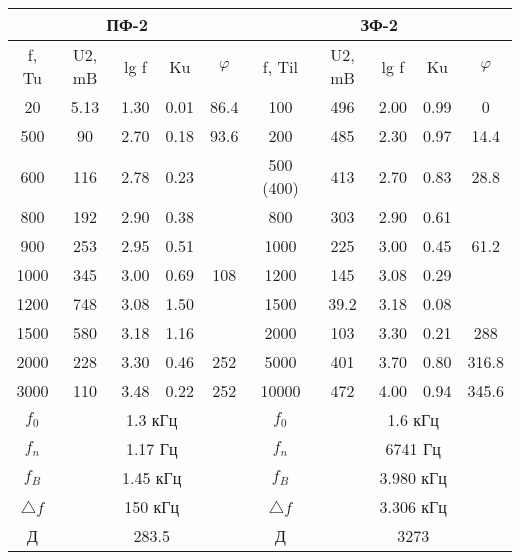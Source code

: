 \documentclass[a4paper,14pt]{extreport}
\begin{document}
\begin{table}[]%
	\begin{center}
		
			\begin{tabular}{|c|c|c|c|c|c|c|c|c|c|}
			\hline
			\multicolumn{5}{|c|}{ПФ-2}               & \multicolumn{5}{c|}{ЗФ-2}                  \\ \hline
			f, Tu      & U2, mB & lg f & Ku   & $\varphi$    & f, Til     & U2, mB  & lg f & Ku   & $\varphi$     \\ \hline
			20         & 5.13   & 1.30 & 0.01 & 86.4 & 100        & 496     & 2.00 & 0.99 & 0     \\ \hline
			500        & 90     & 2.70 & 0.18 & 93.6 & 200        & 485     & 2.30 & 0.97 & 14.4  \\ \hline
			600        & 116    & 2.78 & 0.23 &      & 500 (400)  & 413     & 2.70 & 0.83 & 28.8  \\ \hline
			800        & 192    & 2.90 & 0.38 &      & 800        & 303     & 2.90 & 0.61 &       \\ \hline
			900        & 253    & 2.95 & 0.51 &      & 1000       & 225     & 3.00 & 0.45 & 61.2  \\ \hline
			1000       & 345    & 3.00 & 0.69 & 108  & 1200       & 145     & 3.08 & 0.29 &       \\ \hline
			1200       & 748    & 3.08 & 1.50 &      & 1500       & 39.2    & 3.18 & 0.08 &       \\ \hline
			1500       & 580    & 3.18 & 1.16 &      & 2000       & 103     & 3.30 & 0.21 & 288   \\ \hline
			2000       & 228    & 3.30 & 0.46 & 252  & 5000       & 401     & 3.70 & 0.80 & 316.8 \\ \hline
			3000       & 110    & 3.48 & 0.22 & 252  & 10000      & 472     & 4.00 & 0.94 & 345.6 \\ \hline
			$f_0$      & \multicolumn{4}{c|}{1.3 кГц}    & $f_0$      & \multicolumn{4}{c|}{1.6 кГц}     \\ \hline
			$f_n$      & \multicolumn{4}{c|}{1.17 Гц}   & $f_n$      & \multicolumn{4}{c|}{6741 Гц}    \\ \hline
			$f_B$      & \multicolumn{4}{c|}{1.45 кГц}   & $f_B$      & \multicolumn{4}{c|}{3.980 кГц}    \\ \hline
			$\triangle f$ & \multicolumn{4}{c|}{150 кГц}    & $\triangle f$ & \multicolumn{4}{c|}{3.306 кГц}   \\ \hline
			Д          & \multicolumn{4}{c|}{283.5}  & Д          & \multicolumn{4}{c|}{3273} \\ \hline
			\end{tabular}
		
	\end{center}
\end{table}
\end{document}
